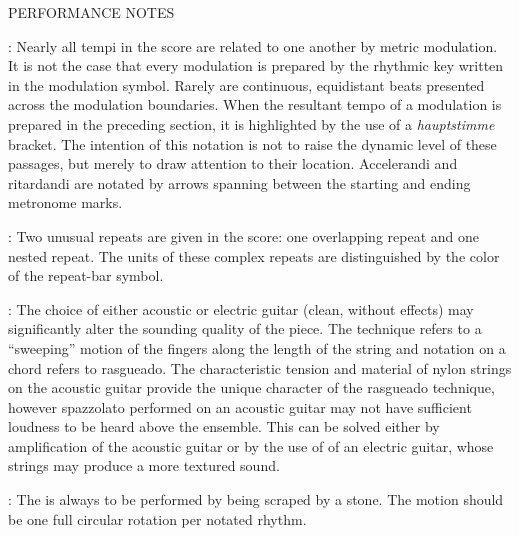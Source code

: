 \documentclass[11pt]{article}
\begin{document}

\begin{center}
\huge PERFORMANCE NOTES
\end{center}
\begingroup
\begin{center}

 : Nearly all tempi in the score are related to one another by metric modulation. It is not the case that every modulation is prepared by the rhythmic key written in the modulation symbol. Rarely are continuous, equidistant beats presented across the modulation boundaries. When the resultant tempo of a modulation is prepared in the preceding section, it is highlighted by the use of a \textit{hauptstimme} bracket. The intention of this notation is not to raise the dynamic level of these passages, but merely to draw attention to their location. Accelerandi and ritardandi are notated by arrows spanning between the starting and ending metronome marks.
\rightskip\leftskip
\phantom{text} \hfill \phantom{()}

 : Two unusual repeats are given in the score: one overlapping repeat and one nested repeat. The units of these complex repeats are distinguished by the color of the repeat-bar symbol.
\rightskip\leftskip
\phantom{text} \hfill \phantom{()}

 : The choice of either acoustic or electric guitar (clean, without effects) may significantly alter the sounding quality of the piece. The  technique refers to a ``sweeping'' motion of the fingers along the length of the string and  notation on a chord refers to rasgueado. The characteristic tension and material of nylon strings on the acoustic guitar provide the unique character of the rasgueado technique, however spazzolato performed on an acoustic guitar may not have sufficient loudness to be heard above the ensemble. This can be solved either by amplification of the acoustic guitar or by the use of of an electric guitar, whose strings may produce a more textured sound. 
\rightskip\leftskip
\phantom{text} \hfill \phantom{()}

 : The  is always to be performed by being scraped by a stone. The motion should be one full circular rotation per notated rhythm.
\rightskip\leftskip
\phantom{text} \hfill \phantom{()}


\end{center}
\end{document}
